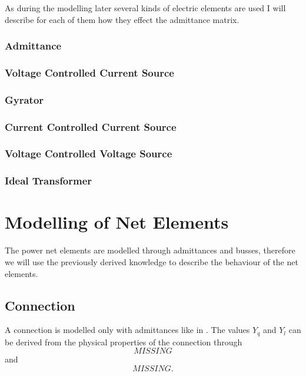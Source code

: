As during the modelling later several kinds of electric elements are used I will describe for each of them how they effect the admittance matrix.

\subsubsection{Admittance}

\subsubsection{Voltage Controlled Current Source}

\subsubsection{Gyrator}

\subsubsection{Current Controlled Current Source}

\subsubsection{Voltage Controlled Voltage Source}

\subsubsection{Ideal Transformer}

\section{Modelling of Net Elements}

The power net elements are modelled through admittances and busses, therefore we will use the previously derived knowledge to describe the behaviour of the net elements.

\subsection{Connection}
A connection is modelled only with admittances like in . The values $Y_q$ and $Y_l$ can be derived from the physical properties of the connection through
\begin{equation}
	MISSING
\end{equation}
and
\begin{equation}
	MISSING.
\end{equation}

